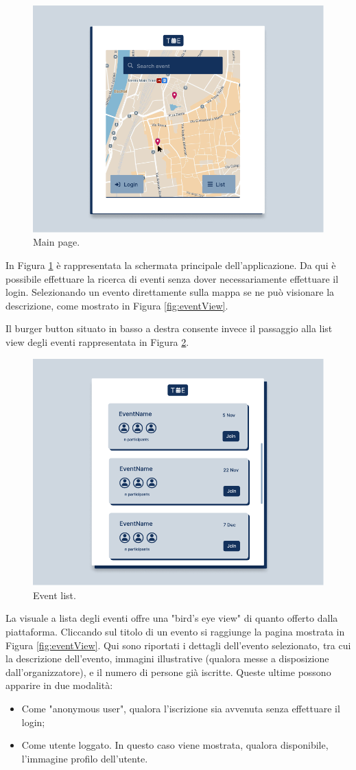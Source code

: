 \documentclass[9pt]{extarticle}
\begin{document}
\begin{figure}[!htb]
	\centering
	\includegraphics[width=.7\linewidth]{./images/MainPage.pdf}
	\caption{Main page.}
	\label{fig:mainPage}
\end{figure}

In Figura \ref{fig:mainPage} è rappresentata la schermata principale dell'applicazione. Da qui è possibile effettuare la ricerca di eventi senza dover necessariamente effettuare il login. Selezionando un evento direttamente sulla mappa se ne può visionare la descrizione, come mostrato in Figura \ref{fig:eventView}.

Il burger button situato in basso a destra consente invece il passaggio alla list view degli eventi rappresentata in Figura \ref{fig:eventList}.

\begin{figure}[!htb]
	\centering
	\includegraphics[width=.7\linewidth]{./images/EventList.pdf}
	\caption{Event list.}
	\label{fig:eventList}
\end{figure}

La visuale a lista degli eventi offre una "bird's eye view" di quanto offerto dalla piattaforma. Cliccando sul titolo di un evento si raggiunge la pagina mostrata in Figura \ref{fig:eventView}. Qui sono riportati i dettagli dell'evento selezionato, tra cui la descrizione dell'evento, immagini illustrative (qualora messe a disposizione dall'organizzatore), e il numero di persone già iscritte. Queste ultime possono apparire in due modalità:
\begin{itemize}
	\item Come "anonymous user", qualora l'iscrizione sia avvenuta senza effettuare il login;
	\item Come utente loggato. In questo caso viene mostrata, qualora disponibile, l'immagine profilo dell'utente.
\end{itemize}
\newpage
\end{document}
